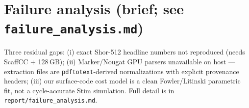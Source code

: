 \documentclass[11pt]{article}
\begin{document}
\section{Failure analysis (brief; see \texttt{failure\_analysis.md})}
\label{sec:failure}
Three residual gaps: (i) exact Shor-512 headline numbers not reproduced
(needs ScaffCC + 128\,GB); (ii) Marker/Nougat GPU parsers unavailable on host
--- extraction files are \texttt{pdftotext}-derived normalizations with
explicit provenance headers; (iii) our surface-code cost model is a clean
Fowler/Litinski parametric fit, not a cycle-accurate Stim simulation.  Full
detail is in \texttt{report/failure\_analysis.md}.
\end{document}
